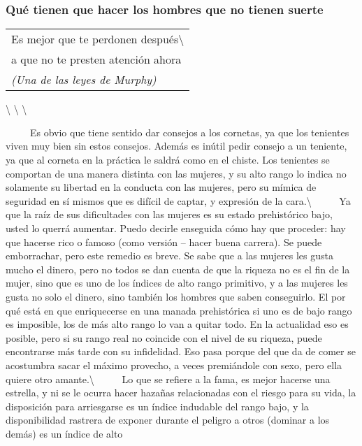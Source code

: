 \protect\hypertarget{M17}{}{}

\subsubsection{Qué tienen que hacer los hombres que no tienen
suerte}\label{quuxe9-tienen-que-hacer-los-hombres-que-no-tienen-suerte}

\begin{longtable}[]{@{}l@{}}
\toprule
Es mejor que te perdonen después\textbackslash{}\tabularnewline
a que no te presten atención ahora\tabularnewline
\emph{(Una de las leyes de Murphy)}\tabularnewline
\bottomrule
\end{longtable}

\textbackslash{} \textbackslash{} \textbackslash{}

~ ~ ~ Es obvio que tiene sentido dar consejos a los cornetas, ya que los
tenientes viven muy bien sin estos consejos. Además es inútil pedir
consejo a un teniente, ya que al corneta en la práctica le saldrá como
en el chiste. Los tenientes se comportan de una manera distinta con las
mujeres, y su alto rango lo indica no solamente su libertad en la
conducta con las mujeres, pero su mímica de seguridad en sí mismos que
es difícil de captar, y expresión de la cara.\textbackslash{} ~ ~ ~ Ya
que la raíz de sus dificultades con las mujeres es su estado
prehistórico bajo, usted lo querrá aumentar. Puedo decirle enseguida
cómo hay que proceder: hay que hacerse rico o famoso (como versión --
hacer buena carrera). Se puede emborrachar, pero este remedio es breve.
Se sabe que a las mujeres les gusta mucho el dinero, pero no todos se
dan cuenta de que la riqueza no es el fin de la mujer, sino que es uno
de los índices de alto rango primitivo, y a las mujeres les gusta no
solo el dinero, sino también los hombres que saben conseguirlo. El por
qué está en que enriquecerse en una manada prehistórica si uno es de
bajo rango es imposible, los de más alto rango lo van a quitar todo. En
la actualidad eso es posible, pero si su rango real no coincide con el
nivel de su riqueza, puede encontrarse más tarde con su infidelidad. Eso
pasa porque del que da de comer se acostumbra sacar el máximo provecho,
a veces premiándole con sexo, pero ella quiere otro
amante.\textbackslash{} ~ ~ ~ Lo que se refiere a la fama, es mejor
hacerse una estrella, y ni se le ocurra hacer hazañas relacionadas con
el riesgo para su vida, la disposición para arriesgarse es un índice
indudable del rango bajo, y la disponibilidad rastrera de exponer
durante el peligro a otros (dominar a los demás) es un índice de alto
